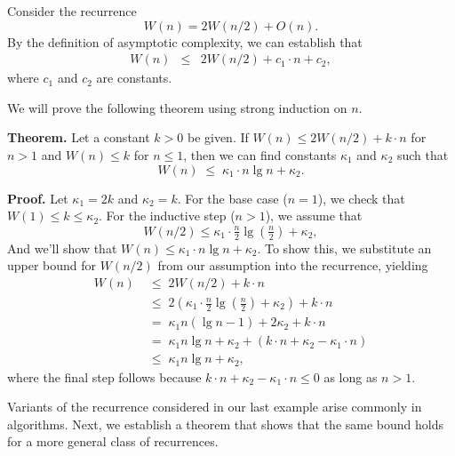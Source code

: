 \begin{cluster}
\label{grp:xmpl:analysis::recurrences::recurrence}

\begin{example}
\label{xmpl:analysis::recurrences::recurrence}
Consider the recurrence
$$
W(n) = 2W(n/2) + O(n).
$$
By the definition of asymptotic complexity, we
can establish that
\begin{eqnarray*}
  W(n) &\leq& 2W(n/2) + c_1\cdot n + c_2,
\end{eqnarray*}
where $c_1$ and $c_2$ are constants.  



We will prove the following theorem using strong induction on $n$.


\textbf{Theorem.}
  Let a constant $k > 0$ be given.  If $W(n) \leq 2 W(n/2) + k \cdot n$ for $n >
  1$ and $W(n) \leq k$ for $n \leq 1$, then we can find constants $\kappa_1$ and
  $\kappa_2$ such that \[ W(n) \;\leq\; \kappa_1 \cdot n \lg n + \kappa_2.\]

\textbf{Proof.}
  Let $\kappa_1 = 2k$ and $\kappa_2 = k$.  For the base case ($n=1$), we check
  that $W(1) \leq k \leq \kappa_2$.  For the inductive step ($n>1$), we assume that
  \[
  W(n/2) \leq \kappa_1 \cdot \tfrac{n}2 \lg (\tfrac{n}2) + \kappa_2,
  \]
  And we'll show that $W(n) \leq \kappa_1 \cdot n \lg n + \kappa_2$.  To show
  this, we substitute an upper bound for $W(n/2)$ from our assumption into the
  recurrence, yielding
  \[ \begin{align*}
    W(n) \;&\leq\; 2W(n/2) + k \cdot n  \\
    \;&\leq\; 2(\kappa_1 \cdot \tfrac{n}2 \lg (\tfrac{n}2) + \kappa_2) + k \cdot n\\
    \;&=\; \kappa_1 n (\lg n - 1) + 2 \kappa_2 + k \cdot n\\
    \;&=\; \kappa_1 n \lg n + \kappa_2 + (k \cdot n + \kappa_2 - \kappa_1 \cdot n)\\
    \;&\leq\; \kappa_1 n \lg n + \kappa_2,
  \end{align*} \]
  where the final step follows because $k \cdot n + \kappa_2 - \kappa_1 \cdot n \leq
  0$ as long as $n > 1$.

\end{example}
\end{cluster}

\begin{cluster}
\label{grp:grm:analysis::recurrences::variants}

\begin{gram}
\label{grm:analysis::recurrences::variants}
Variants of the recurrence considered in our last example arise
commonly in algorithms.  Next, we establish a theorem that shows that
the same bound holds for a more general class of recurrences. 

\end{gram}
\end{cluster}

